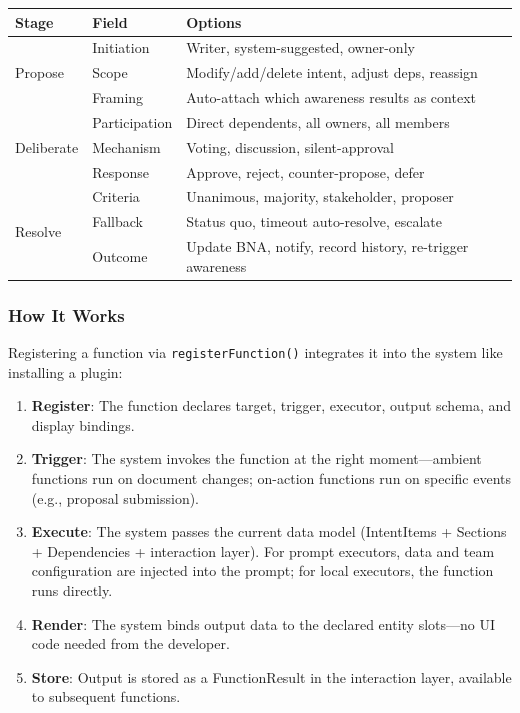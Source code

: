 \begin{table}[h]
\small
\begin{tabular}{@{}llp{5cm}@{}}
\toprule
\textbf{Stage} & \textbf{Field} & \textbf{Options} \\
\midrule
\multirow{3}{*}{Propose} & Initiation & Writer, system-suggested, owner-only \\
& Scope & Modify/add/delete intent, adjust deps, reassign \\
& Framing & Auto-attach which awareness results as context \\
\midrule
\multirow{3}{*}{Deliberate} & Participation & Direct dependents, all owners, all members \\
& Mechanism & Voting, discussion, silent-approval \\
& Response & Approve, reject, counter-propose, defer \\
\midrule
\multirow{3}{*}{Resolve} & Criteria & Unanimous, majority, stakeholder, proposer \\
& Fallback & Status quo, timeout auto-resolve, escalate \\
& Outcome & Update BNA, notify, record history, re-trigger awareness \\
\bottomrule
\end{tabular}
\end{table}


\subsubsection{How It Works}

Registering a function via \texttt{registerFunction()} integrates it into the system like installing a plugin:

\begin{enumerate}[leftmargin=1.5em, itemsep=1pt]
\item \textbf{Register}: The function declares target, trigger, executor, output schema, and display bindings.
\item \textbf{Trigger}: The system invokes the function at the right moment---ambient functions run on document changes; on-action functions run on specific events (e.g., proposal submission).
\item \textbf{Execute}: The system passes the current data model (IntentItems + Sections + Dependencies + interaction layer). For prompt executors, data and team configuration are injected into the prompt; for local executors, the function runs directly.
\item \textbf{Render}: The system binds output data to the declared entity slots---no UI code needed from the developer.
\item \textbf{Store}: Output is stored as a FunctionResult in the interaction layer, available to subsequent functions.
\end{enumerate}

